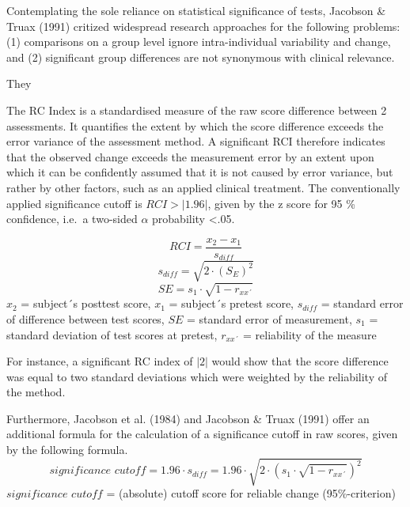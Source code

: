 \documentclass[12pt,twoside]{reedthesis}
\begin{document}
Contemplating the sole reliance on statistical significance of tests, Jacobson \& Truax (1991) critized widespread research approaches for the following problems: (1) comparisons on a group level ignore intra-individual variability and change, and (2) significant group differences are not synonymous with clinical relevance.

\par

They

\par

The RC Index is a standardised measure of the raw score difference between 2 assessments. It quantifies the extent by which the score difference exceeds the error variance of the assessment method. A significant RCI therefore indicates that the observed change exceeds the measurement error by an extent upon which it can be confidently assumed that it is not caused by error variance, but rather by other factors, such as an applied clinical treatment. The conventionally applied significance cutoff is \(RCI>|1.96|\), given by the z score for 95 \% confidence, i.e.~a two-sided \(\alpha\) probability \textless.05.

\par
\begin{equation}
RCI = \frac{x_{2} - x_{1}}  {s_{diff}} \label{eq:rci-jt}
\end{equation}
\begin{equation}
s_{diff} = \sqrt{2 \cdot (S_{E})^2} \label{eq:rci-jt-sdiff}
\end{equation}
\begin{equation}
SE = s_{1} \cdot \sqrt{1 - r_{xx \text{´}}} \label{eq:rci-jt-se}
\end{equation}
\noindent \(x_{2}\) = subject´s posttest score,
\(x_{1}\) = subject´s pretest score,
\(s_{diff}\) = standard error of difference between test scores,
\(SE\) = standard error of measurement,
\(s_{1}\) = standard deviation of test scores at pretest,
\(r_{xx \text{´}}\) = reliability of the measure

\par

For instance, a significant RC index of \(|2|\) would show that the score difference was equal to two standard deviations which were weighted by the reliability of the method.

\par

Furthermore, Jacobson et al. (1984) and Jacobson \& Truax (1991) offer an additional formula for the calculation of a significance cutoff in raw scores, given by the following formula.
\begin{equation}
\textit{significance cutoff} = 1.96 \cdot s_{diff} = 1.96 \cdot \sqrt{2 \cdot (s_{1} \cdot \sqrt{1 - r_{xx \text{´}}})^2} \label{eq:rci-jt-cut}
\end{equation}
\noindent \(\textit{significance cutoff}\) = (absolute) cutoff score for reliable change (95\%-criterion)
\end{document}
